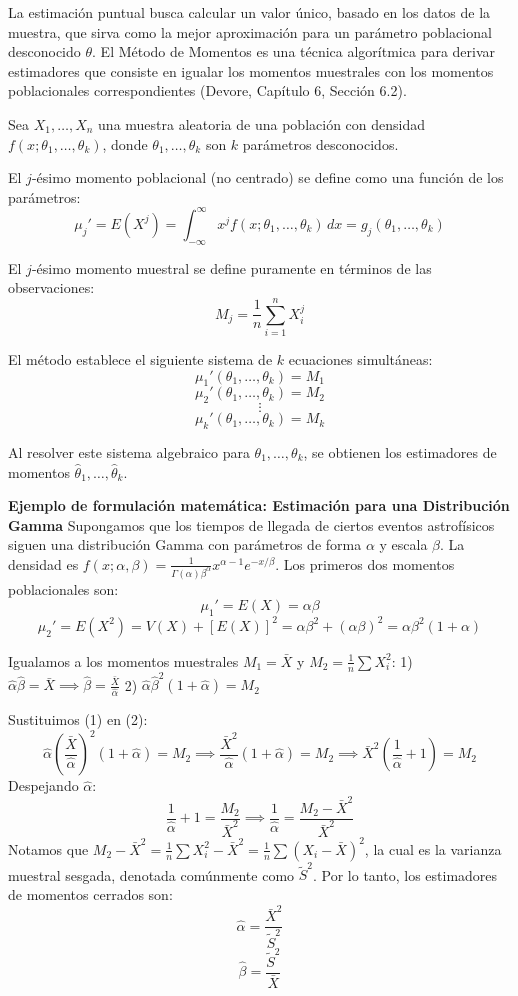 La estimación puntual busca calcular un valor único, basado en los datos de la muestra, que sirva como la mejor aproximación para un parámetro poblacional desconocido $\theta$. El Método de Momentos es una técnica algorítmica para derivar estimadores que consiste en igualar los momentos muestrales con los momentos poblacionales correspondientes (Devore, Capítulo 6, Sección 6.2).

Sea $X_1, \dots, X_n$ una muestra aleatoria de una población con densidad $f(x; \theta_1, \dots, \theta_k)$, donde $\theta_1, \dots, \theta_k$ son $k$ parámetros desconocidos. 

El $j$-ésimo momento poblacional (no centrado) se define como una función de los parámetros:
$$ \mu_j' = E(X^j) = \int_{-\infty}^{\infty} x^j f(x; \theta_1, \dots, \theta_k) \, dx = g_j(\theta_1, \dots, \theta_k) $$

El $j$-ésimo momento muestral se define puramente en términos de las observaciones:
$$ M_j = \frac{1}{n} \sum_{i=1}^{n} X_i^j $$

El método establece el siguiente sistema de $k$ ecuaciones simultáneas:
$$ \mu_1'(\theta_1, \dots, \theta_k) = M_1 $$
$$ \mu_2'(\theta_1, \dots, \theta_k) = M_2 $$
$$ \vdots $$
$$ \mu_k'(\theta_1, \dots, \theta_k) = M_k $$

Al resolver este sistema algebraico para $\theta_1, \dots, \theta_k$, se obtienen los estimadores de momentos $\hat{\theta}_1, \dots, \hat{\theta}_k$.

\textbf{Ejemplo de formulación matemática: Estimación para una Distribución Gamma}
Supongamos que los tiempos de llegada de ciertos eventos astrofísicos siguen una distribución Gamma con parámetros de forma $\alpha$ y escala $\beta$. La densidad es $f(x; \alpha, \beta) = \frac{1}{\Gamma(\alpha)\beta^\alpha} x^{\alpha-1} e^{-x/\beta}$. Los primeros dos momentos poblacionales son:
$$ \mu_1' = E(X) = \alpha\beta $$
$$ \mu_2' = E(X^2) = V(X) + [E(X)]^2 = \alpha\beta^2 + (\alpha\beta)^2 = \alpha\beta^2(1 + \alpha) $$

Igualamos a los momentos muestrales $M_1 = \bar{X}$ y $M_2 = \frac{1}{n}\sum X_i^2$:
1) $\hat{\alpha}\hat{\beta} = \bar{X} \implies \hat{\beta} = \frac{\bar{X}}{\hat{\alpha}}$
2) $\hat{\alpha}\hat{\beta}^2(1 + \hat{\alpha}) = M_2$

Sustituimos (1) en (2):
$$ \hat{\alpha} \left( \frac{\bar{X}}{\hat{\alpha}} \right)^2 (1 + \hat{\alpha}) = M_2 \implies \frac{\bar{X}^2}{\hat{\alpha}} (1 + \hat{\alpha}) = M_2 \implies \bar{X}^2 \left( \frac{1}{\hat{\alpha}} + 1 \right) = M_2 $$
Despejando $\hat{\alpha}$:
$$ \frac{1}{\hat{\alpha}} + 1 = \frac{M_2}{\bar{X}^2} \implies \frac{1}{\hat{\alpha}} = \frac{M_2 - \bar{X}^2}{\bar{X}^2} $$
Notamos que $M_2 - \bar{X}^2 = \frac{1}{n}\sum X_i^2 - \bar{X}^2 = \frac{1}{n}\sum (X_i - \bar{X})^2$, la cual es la varianza muestral sesgada, denotada comúnmente como $\tilde{S}^2$. Por lo tanto, los estimadores de momentos cerrados son:
$$ \hat{\alpha} = \frac{\bar{X}^2}{\tilde{S}^2} $$
$$ \hat{\beta} = \frac{\tilde{S}^2}{\bar{X}} $$


